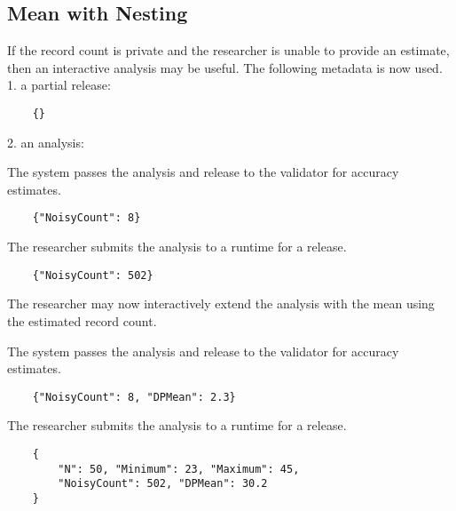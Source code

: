 \documentclass[11pt]{article}
\begin{document}
\subsection{Mean with Nesting}
If the record count is private and the researcher is unable to provide an estimate, then an interactive analysis may be useful. The following metadata is now used. \\
1. a partial release:
\begin{verbatim}
    {}
\end{verbatim}
2. an analysis:
\begin {center}
\end{center}
The system passes the analysis and release to the validator for accuracy estimates.
\begin{verbatim}
    {"NoisyCount": 8}
\end{verbatim}
The researcher submits the analysis to a runtime for a release.
\begin{verbatim}
    {"NoisyCount": 502}
\end{verbatim} 
The researcher may now interactively extend the analysis with the mean using the estimated record count.
\begin {center}
\end{center}
The system passes the analysis and release to the validator for accuracy estimates.
\begin{verbatim}
    {"NoisyCount": 8, "DPMean": 2.3}
\end{verbatim}
The researcher submits the analysis to a runtime for a release.
\begin{verbatim}
    {
        "N": 50, "Minimum": 23, "Maximum": 45, 
        "NoisyCount": 502, "DPMean": 30.2
    }
\end{verbatim}
\end{document}
